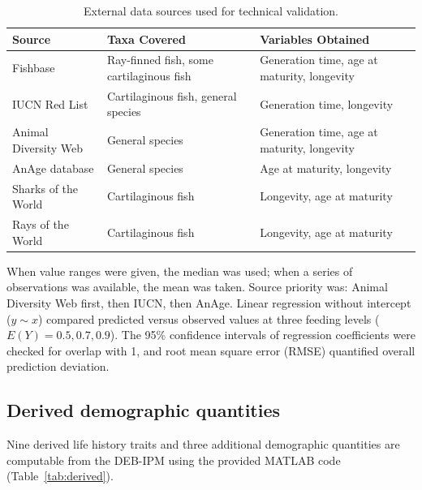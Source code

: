 \documentclass[11pt]{article}
\begin{document}
\begin{table}[ht]
\centering
\caption{External data sources used for technical validation.}
\label{tab:sources}
\begin{tabular}{lll}
\toprule
Source & Taxa Covered & Variables Obtained \\
\midrule
Fishbase & Ray-finned fish, some cartilaginous fish & Generation time, age at maturity, longevity \\
IUCN Red List & Cartilaginous fish, general species & Generation time, longevity \\
Animal Diversity Web & General species & Generation time, age at maturity, longevity \\
AnAge database & General species & Age at maturity, longevity \\
Sharks of the World & Cartilaginous fish & Longevity, age at maturity \\
Rays of the World & Cartilaginous fish & Longevity, age at maturity \\
\bottomrule
\end{tabular}
\end{table}

When value ranges were given, the median was used; when a series of observations was available, the mean was taken. Source priority was: Animal Diversity Web first, then IUCN, then AnAge. Linear regression without intercept ($y \sim x$) compared predicted versus observed values at three feeding levels ($E(Y) = 0.5, 0.7, 0.9$). The 95\% confidence intervals of regression coefficients were checked for overlap with 1, and root mean square error (RMSE) quantified overall prediction deviation.

\subsection{Derived demographic quantities}

Nine derived life history traits and three additional demographic quantities are computable from the DEB-IPM using the provided MATLAB code (Table~\ref{tab:derived}).
\end{document}
